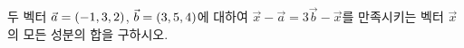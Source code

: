 두 벡터 $\vec{a}=(-1{,}\mkern3mu\mathopen{}3{,}\mkern3mu\mathopen{}2)$, $\vec{b}=(3{,}\mkern3mu\mathopen{}5{,}\mkern3mu\mathopen{}4)$에 대하여 \mbox{$\vec{x}-\vec{a}=3\vec{b}-\vec{x}$를} 만족시키는 벡터 $\vec{x}$의 모든 성분의 합을 구하시오.
